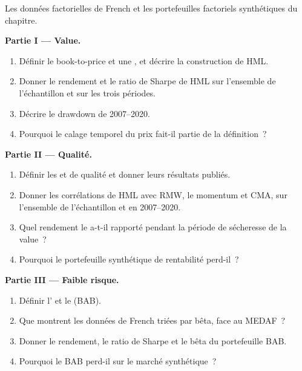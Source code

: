 \begin{problem}\label{pb:s1:value-quality-and-low-risk:1}
Les données factorielles de French et les portefeuilles factoriels synthétiques du chapitre.

\medskip\noindent\textbf{Partie I --- Value.}
\begin{enumerate}
\item Définir le book-to-price et une , et décrire la construction de HML.
\item Donner le rendement et le ratio de Sharpe de HML sur l'ensemble de l'échantillon et sur les trois périodes.
\item Décrire le drawdown de 2007--2020.
\item Pourquoi le calage temporel du prix fait-il partie de la définition~?
\end{enumerate}

\medskip\noindent\textbf{Partie II --- Qualité.}
\begin{enumerate}[resume]
\item Définir les  et de qualité et donner leurs résultats publiés.
\item Donner les corrélations de HML avec RMW, le momentum et CMA, sur l'ensemble de l'échantillon et en 2007--2020.
\item Quel rendement le  a-t-il rapporté pendant la période de sécheresse de la value~?
\item Pourquoi le portefeuille synthétique de rentabilité perd-il~?
\end{enumerate}

\medskip\noindent\textbf{Partie III --- Faible risque.}
\begin{enumerate}[resume]
\item Définir l' et le  (BAB).
\item Que montrent les données de French triées par bêta, face au MEDAF~?
\item Donner le rendement, le ratio de Sharpe et le bêta du portefeuille BAB.
\item Pourquoi le BAB perd-il sur le marché synthétique~?
\end{enumerate}


\end{problem}
